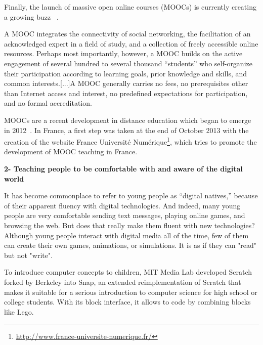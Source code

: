 Finally, the launch of massive open online courses (MOOCs) is currently creating a growing buzz ~\parencite{mackness2010ideals}.

\begin{formal}
    A MOOC integrates the connectivity of social networking, the facilitation of an acknowledged expert in a field of study, and a collection of freely accessible online resources. Perhaps most importantly, however, a MOOC builds on the active engagement of several hundred to several thousand “students” who self-organize their participation according to learning goals, prior knowledge and skills, and common interests.[...]A MOOC generally carries no fees, no prerequisites other than Internet access and interest, no predefined expectations for participation, and no formal accreditation.

\end{formal}

MOOCs are a recent development in distance education which began to emerge in 2012~\parencite{pappano2012year}. In France, a first step was taken at the end of October 2013 with the creation of the website France Université Numérique\footnote{\url{http://www.france-universite-numerique.fr/}}, which tries to promote the development of MOOC teaching in France.


\textbf{2- Teaching people to be comfortable with and aware of the digital world}


\begin{formal}

    It has become commonplace to refer to young people as “digital natives,” because of their apparent fluency with digital technologies. And indeed, many young people are very comfortable sending text messages, playing online games, and browsing the web. But does that really make them fluent with new technologies? Although young people interact with digital media all of the time, few of them can create their own games, animations, or simulations. It is as if they can "read" but not "write".

\end{formal}

To introduce computer concepts to children, MIT Media Lab developed Scratch~\parencite{resnick2009scratch} forked by Berkeley into Snap, an extended reimplementation of Scratch that makes it suitable for a serious introduction to computer science for high school or college students. With its block interface, it allows to code by combining blocks like Lego.

